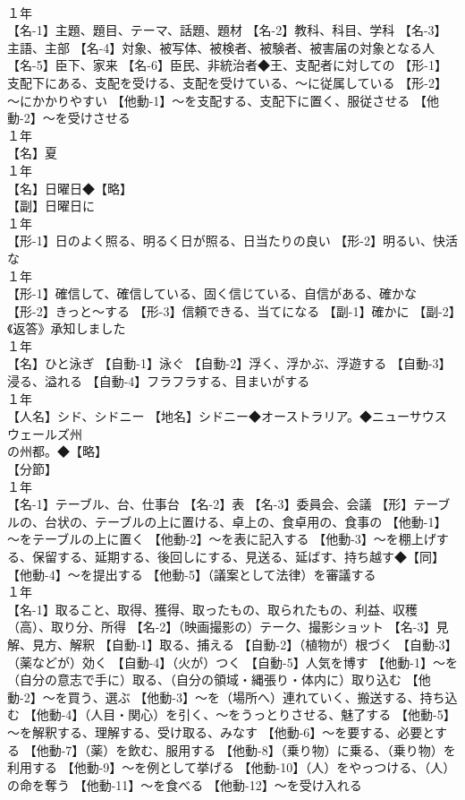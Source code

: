 \documentclass[8pt]{extreport}
\begin{document}
\begin{CJK}{UTF8}{min}
\\	１年	
\\	【名-1】主題、題目、テーマ、話題、題材 【名-2】教科、科目、学科 【名-3】主語、主部 【名-4】対象、被写体、被検者、被験者、被害届の対象となる人 【名-5】臣下、家来 【名-6】臣民、非統治者◆王、支配者に対しての 【形-1】支配下にある、支配を受ける、支配を受けている、～に従属している 【形-2】～にかかりやすい 【他動-1】～を支配する、支配下に置く、服従させる 【他動-2】～を受けさせる
\\	１年	
\\	【名】夏
\\	１年	
\\	【名】日曜日◆【略】
\\	【副】日曜日に
\\	１年	
\\	【形-1】日のよく照る、明るく日が照る、日当たりの良い 【形-2】明るい、快活な
\\	１年	
\\	【形-1】確信して、確信している、固く信じている、自信がある、確かな 【形-2】きっと～する 【形-3】信頼できる、当てになる 【副-1】確かに 【副-2】《返答》承知しました
\\	１年	
\\	【名】ひと泳ぎ 【自動-1】泳ぐ 【自動-2】浮く、浮かぶ、浮遊する 【自動-3】浸る、溢れる 【自動-4】フラフラする、目まいがする
\\	１年	
\\	【人名】シド、シドニー 【地名】シドニー◆オーストラリア。◆ニューサウスウェールズ州 
\\	の州都。◆【略】
\\	【分節】
\\	１年	
\\	【名-1】テーブル、台、仕事台 【名-2】表 【名-3】委員会、会議 【形】テーブルの、台状の、テーブルの上に置ける、卓上の、食卓用の、食事の 【他動-1】～をテーブルの上に置く 【他動-2】～を表に記入する 【他動-3】～を棚上げする、保留する、延期する、後回しにする、見送る、延ばす、持ち越す◆【同】
\\	【他動-4】～を提出する 【他動-5】（議案として法律）を審議する
\\	１年	
\\	【名-1】取ること、取得、獲得、取ったもの、取られたもの、利益、収穫（高）、取り分、所得 【名-2】（映画撮影の）テーク、撮影ショット 【名-3】見解、見方、解釈 【自動-1】取る、捕える 【自動-2】（植物が）根づく 【自動-3】（薬などが）効く 【自動-4】（火が）つく 【自動-5】人気を博す 【他動-1】～を（自分の意志で手に）取る、（自分の領域・縄張り・体内に）取り込む 【他動-2】～を買う、選ぶ 【他動-3】～を（場所へ）連れていく、搬送する、持ち込む 【他動-4】（人目・関心）を引く、～をうっとりさせる、魅了する 【他動-5】～を解釈する、理解する、受け取る、みなす 【他動-6】～を要する、必要とする 【他動-7】（薬）を飲む、服用する 【他動-8】（乗り物）に乗る、（乗り物）を利用する 【他動-9】～を例として挙げる 【他動-10】（人）をやっつける、（人）の命を奪う 【他動-11】～を食べる 【他動-12】～を受け入れる

\end{CJK}
\end{document}
